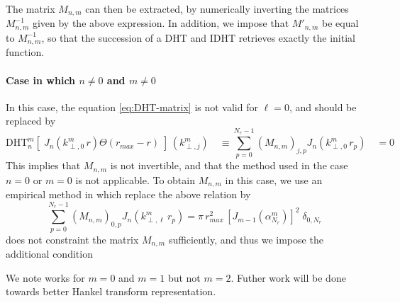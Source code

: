 \noindent The matrix $M_{n,m}$ can then be extracted, by numerically inverting
the matrices  $M^{-1}_{n,m}$ given by the above expression. In
addition, we impose that $M'_{n,m}$ be equal to
$M^{-1}_{n,m}$, so that the succession of a DHT and IDHT retrieves
exactly the initial function.


\paragraph{Case in which $n \neq 0$ and $m \neq 0$} In this case, the
equation \cref{eq:DHT-matrix} is not valid for $\ell=0$, and should be
replaced by
\[ \mathrm{DHT}^m_{n}[ \; J_n(k^m_{\perp,0} \,r) \Theta(r_{max}-r)  \;] \,(k^m_{\perp,j}) 
\quad \equiv \sum_{p=0}^{N_r-1} (M_{n,m})_{j,p}
  J_n(k^m_{\perp,0}\,r_p) \quad = 0 \]
\noindent This implies that $M_{n,m}$ is not invertible, and that the
method used in the case $n=0$ or $m=0$ is not applicable. To obtain
$M_{n,m}$ in this case, we use an empirical method in which replace
the above relation by 
\[\sum_{p=0}^{N_r-1} (M_{n,m})_{0,p}J_n(k^m_{\perp,\ell}\,r_p) = \pi\,
r_{max}^2\,[ J_{m-1}(\alpha_{N_r}^m)]^2 \; \delta_{0,N_r} \]
does not constraint the matrix $M_{n,m}$
sufficiently, and thus we impose the additional condition 

We note works for $m=0$ and $m=1$ but not $m=2$. Futher work will be
done towards better Hankel transform representation.

